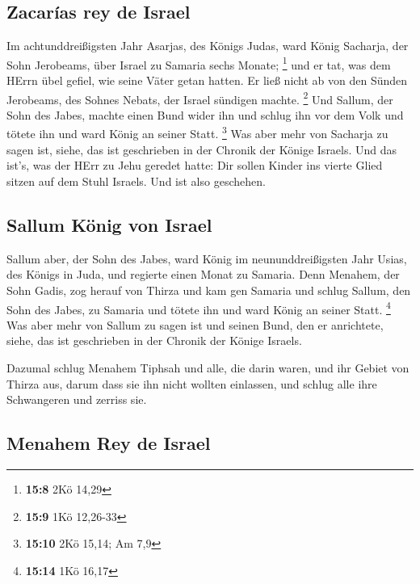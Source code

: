 \hypertarget{zacaruxedas-rey-de-israel}{%
\subsection{Zacarías rey de Israel}\label{zacaruxedas-rey-de-israel}}

 Im achtunddreißigsten Jahr Asarjas, des Königs Judas,
ward König Sacharja, der Sohn Jerobeams, über Israel zu Samaria sechs
Monate; \footnote{\textbf{15:8} 2Kö 14,29}  und er tat,
was dem HErrn übel gefiel, wie seine Väter getan hatten. Er ließ nicht
ab von den Sünden Jerobeams, des Sohnes Nebats, der Israel sündigen
machte. \footnote{\textbf{15:9} 1Kö 12,26-33}  Und
Sallum, der Sohn des Jabes, machte einen Bund wider ihn und schlug ihn
vor dem Volk und tötete ihn und ward König an seiner Statt. \footnote{\textbf{15:10}
  2Kö 15,14; Am 7,9}  Was aber mehr von Sacharja zu sagen
ist, siehe, das ist geschrieben in der Chronik der Könige Israels.
 Und das ist's, was der HErr zu Jehu geredet hatte: Dir
sollen Kinder ins vierte Glied sitzen auf dem Stuhl Israels. Und ist
also geschehen.

\hypertarget{sallum-kuxf6nig-von-israel}{%
\subsection{Sallum König von Israel}\label{sallum-kuxf6nig-von-israel}}

 Sallum aber, der Sohn des Jabes, ward König im
neununddreißigsten Jahr Usias, des Königs in Juda, und regierte einen
Monat zu Samaria.  Denn Menahem, der Sohn Gadis, zog
herauf von Thirza und kam gen Samaria und schlug Sallum, den Sohn des
Jabes, zu Samaria und tötete ihn und ward König an seiner Statt.
\footnote{\textbf{15:14} 1Kö 16,17}  Was aber mehr von
Sallum zu sagen ist und seinen Bund, den er anrichtete, siehe, das ist
geschrieben in der Chronik der Könige Israels.

 Dazumal schlug Menahem Tiphsah und alle, die darin
waren, und ihr Gebiet von Thirza aus, darum dass sie ihn nicht wollten
einlassen, und schlug alle ihre Schwangeren und zerriss sie.

\hypertarget{menahem-rey-de-israel}{%
\subsection{Menahem Rey de Israel}\label{menahem-rey-de-israel}}

